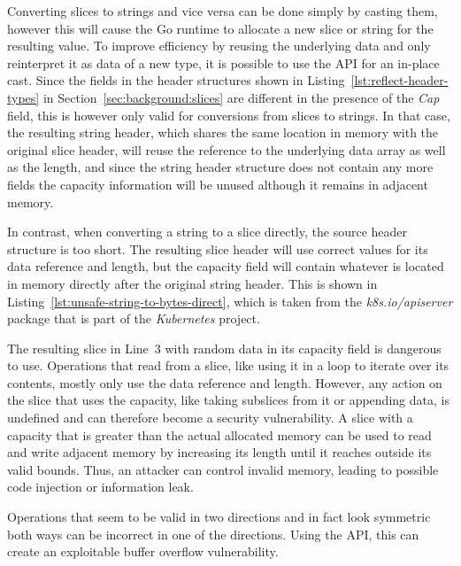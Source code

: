 Converting slices to strings and vice versa can be done simply by casting them, however this will cause the Go runtime
to allocate a new slice or string for the resulting value.
To improve efficiency by reusing the underlying data and only reinterpret it as data of a new type, it is possible to
use the \unsafe{} \acrshort{API} for an in-place cast.
Since the fields in the header structures shown in Listing~\ref{lst:reflect-header-types} in
Section~\ref{sec:background:slices} are different in the presence of the \textit{Cap} field, this is however only valid
for conversions from slices to strings.
In that case, the resulting string header, which shares the same location in memory with the original slice header, will
reuse the reference to the underlying data array as well as the length, and since the string header structure does not
contain any more fields the capacity information will be unused although it remains in adjacent memory.

In contrast, when converting a string to a slice directly, the source header structure is too short.
The resulting slice header will use correct values for its data reference and length, but the capacity field will
contain whatever is located in memory directly after the original string header.
This is shown in Listing~\ref{lst:unsafe-string-to-bytes-direct}, which is taken from the \textit{k8s.io/apiserver}
package that is part of the \textit{Kubernetes} project.



The resulting slice in Line~3 with random data in its capacity field is dangerous to use.
Operations that read from a slice, like using it in a loop to iterate over its contents, mostly only use the data
reference and length.
However, any action on the slice that uses the capacity, like taking subslices from it or appending data, is undefined
and can therefore become a security vulnerability.
A slice with a capacity that is greater than the actual allocated memory can be used to read and write adjacent memory
by increasing its length until it reaches outside its valid bounds.
Thus, an attacker can control invalid memory, leading to possible code injection or information leak.

\begin{insight}
    Operations that seem to be valid in two directions and in fact look symmetric both ways can be incorrect in one of
    the directions.
    Using the \unsafe{} \acrshort{API}, this can create an exploitable buffer overflow vulnerability.
\end{insight}


